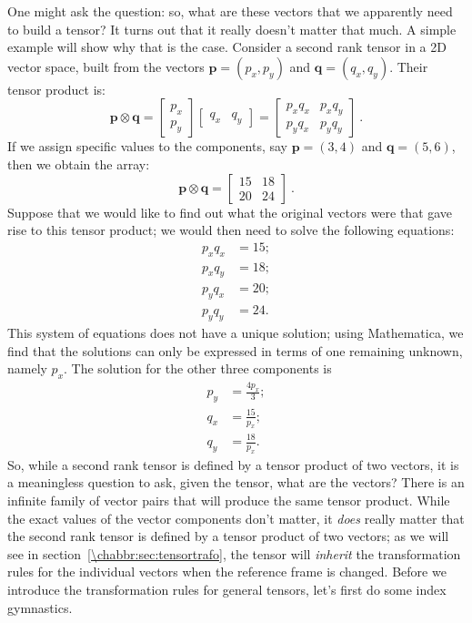 One might ask the question: so, what are these vectors that we apparently need to build a tensor?  It turns out that it really doesn't matter that much. A simple example will show why that is the case. Consider a second rank tensor in a 2D vector space, built from the vectors $\mathbf{p}=(p_x,p_y)$ and $\mathbf{q}=(q_x,q_y)$.  Their tensor product is:
\begin{equation}
	\mathbf{p}\otimes\mathbf{q} = \begin{bmatrix}p_x\\ p_y\end{bmatrix}\begin{bmatrix}q_x&q_y\end{bmatrix}=\begin{bmatrix}p_xq_x&p_xq_y\\ p_yq_x&p_yq_y\end{bmatrix}\ .
\end{equation}
If we assign specific values to the components, say $\mathbf{p}=(3,4)$ and $\mathbf{q}=(5,6)$, then we obtain the array:
\begin{equation}
	\mathbf{p}\otimes\mathbf{q} = \begin{bmatrix}15&18\\ 20&24\end{bmatrix}\ .
\end{equation}
Suppose that we would like to find out what the original vectors were that gave rise to this tensor product; we would then need to solve the following equations:
\begin{equation}
	\begin{split}
		p_xq_x &= 15;\\
		p_xq_y &= 18;\\
		p_yq_x &= 20;\\
		p_yq_y &= 24.
	\end{split}
\end{equation}
This system of equations does not have a unique solution; using Mathematica, we find that the solutions can only be expressed in terms of one remaining unknown, namely $p_x$. The solution for the other three components is
\begin{equation}
	\begin{split}
		p_y &= \frac{4 p_x}{3};\\
		q_x &= \frac{15}{p_x};\\
		q_y &= \frac{18}{p_x}.
	\end{split}
\end{equation}
So, while a second rank tensor is defined by a tensor product of two vectors, it is a meaningless question to  ask, given the tensor, what are the vectors?  There is an infinite family of vector pairs that will produce the same tensor product.  While the exact values of the vector components don't matter, it \textit{does} really matter that the second rank tensor is defined by a tensor product of two vectors; as we will see in section~\ref{\chabbr:sec:tensortrafo}, the tensor will \textit{inherit} the transformation rules for the individual vectors when the reference frame is changed.   Before we introduce the transformation rules for general tensors, let's first do some index gymnastics.

